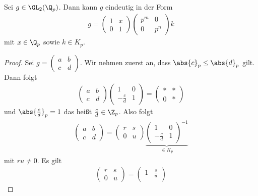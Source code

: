 \begin{prop}
Sei $g \in \GL_2(\Q_p)$. Dann kann $g$ eindeutig in der Form
\begin{align*}
g=\begin{pmatrix}
1&x\\
0&1
\end{pmatrix} \begin{pmatrix}
p^m&0\\
0&p^n
\end{pmatrix}
k
\end{align*}
mit $x\in \Q_p$ sowie $k\in K_p$.
\end{prop}
\begin{proof}
Sei $g=\begin{pmatrix}
a&b\\
c&d
\end{pmatrix}$. Wir nehmen zuerst an, dass $\abs{c}_p\leq \abs{d}_p$ gilt.
Dann folgt
\begin{align*}
\begin{pmatrix}
a&b\\
c&d
\end{pmatrix}\begin{pmatrix}
1&0\\
-\frac{c}{d}&1
\end{pmatrix}
=\begin{pmatrix}
\ast&\ast\\
0&\ast
\end{pmatrix}
\end{align*}
und $\abs{\frac{c}{d}}_p=1$ das heißt $\frac{c}{d}\in \Z_p$.
Also folgt
\begin{align*}
\begin{pmatrix}
a&b\\
c&d
\end{pmatrix}=\begin{pmatrix}
r&s\\
0&u
\end{pmatrix}
\underbrace{\begin{pmatrix}
1&0\\
-\frac{c}{d}&1
\end{pmatrix}^{-1}}_{\in K_p}
\end{align*}
mit $ru\not =0$.
Es gilt
\begin{align*}
\begin{pmatrix}
r&s\\
0&u
\end{pmatrix}=\begin{pmatrix}
1&\frac{s}{u}\\

\end{pmatrix}
\end{align*}
\end{proof}
